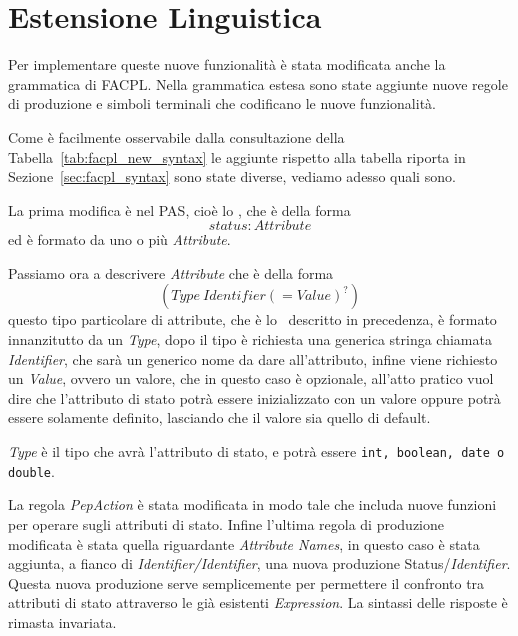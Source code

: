 \section{Estensione Linguistica} %
\label{sec:estensione_linguistica}
Per implementare queste nuove funzionalità è stata modificata anche la grammatica di \ac{FACPL}.
Nella grammatica estesa sono state aggiunte nuove regole di produzione e simboli terminali che 
codificano le nuove funzionalità. \par

Come è facilmente osservabile dalla consultazione della Tabella~\ref{tab:facpl_new_syntax} le aggiunte rispetto alla tabella riporta in Sezione~\ref{sec:facpl_syntax} sono state diverse, vediamo adesso quali sono. \par
La prima modifica è nel \ac{PAS}, cioè  lo \status, che è della forma $$status: Attribute$$ ed è formato da uno o più \textit{Attribute}. \par
Passiamo ora a descrivere \textit{Attribute} che è della forma $$(Type\ Identifier (= Value)^?)$$
questo tipo particolare di attribute, che è lo \statusattribute \ descritto in precedenza, è formato innanzitutto da un \textit{Type}, dopo il tipo è richiesta una generica stringa chiamata \textit{Identifier}, che sarà un generico nome da dare all'attributo, infine viene richiesto un \textit{Value}, ovvero un valore, che in questo caso è opzionale, all'atto pratico vuol dire che l'attributo di stato potrà essere inizializzato con un valore oppure potrà essere solamente definito, lasciando che il valore sia quello di default.

\textit{Type} è il tipo che avrà l'attributo di stato, e potrà essere \texttt{int, boolean, date o double}. \par
La regola \textit{PepAction} è stata modificata in modo tale che includa nuove funzioni per operare sugli attributi di stato.
Infine l'ultima regola di produzione modificata è stata quella riguardante \textit{Attribute Names}, in questo caso è stata aggiunta, a fianco di \textit{Identifier/Identifier}, una nuova produzione Status/\textit{Identifier}. Questa nuova produzione serve semplicemente per permettere il confronto tra attributi di stato attraverso le già esistenti \textit{Expression}.
La sintassi delle risposte è rimasta invariata.


